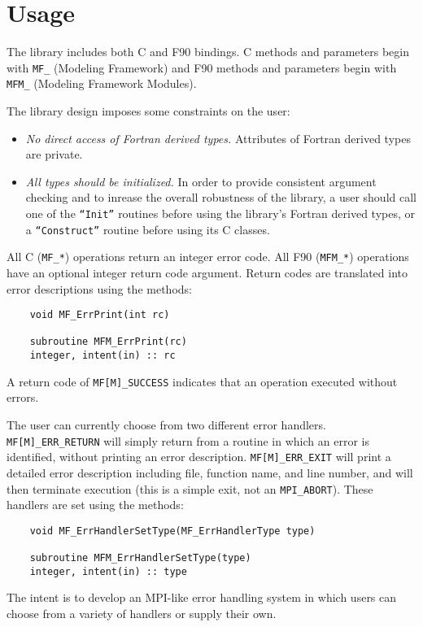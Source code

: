 \section{Usage}

The library includes both C and F90 bindings.  C methods and 
parameters begin with {\tt MF\_} (Modeling Framework) and F90 
methods and parameters begin with {\tt MFM\_} (Modeling Framework 
Modules).


The library design imposes some constraints on the user:

\begin{itemize}
\item {\it No direct access of Fortran derived types.}  Attributes
of Fortran derived types are private.

\item{\it All types should be initialized.} In order to provide consistent
argument checking and to inrease the overall robustness of the library,
a user should call one of the {\tt ``Init''} routines before using the
library's Fortran derived types, or a {\tt ``Construct''} routine before 
using its C classes.

\end{itemize}


All C ({\tt MF\_*}) operations return an integer error code.  
All F90 ({\tt MFM\_*}) operations have an optional integer return code 
argument.  Return codes are translated into error descriptions using the 
methods: 

\begin{verbatim}
    void MF_ErrPrint(int rc)

    subroutine MFM_ErrPrint(rc)  
    integer, intent(in) :: rc
\end{verbatim}

A return code of {\tt MF[M]\_SUCCESS} indicates that an 
operation executed without errors.

The user can currently choose from two different error handlers.
{\tt MF[M]\_ERR\_RETURN} will simply return from a routine in which an error 
is identified, without printing an error description.
{\tt MF[M]\_ERR\_EXIT} will print a detailed error description including
file, function name, and line number, and will then terminate execution
(this is a simple exit, not an {\tt MPI\_ABORT}).  These handlers are set 
using the methods: 
\begin{verbatim}
    void MF_ErrHandlerSetType(MF_ErrHandlerType type)

    subroutine MFM_ErrHandlerSetType(type)
    integer, intent(in) :: type
\end{verbatim}

The intent is to develop an MPI-like error handling system in which
users can choose from a variety of handlers or supply their own.



